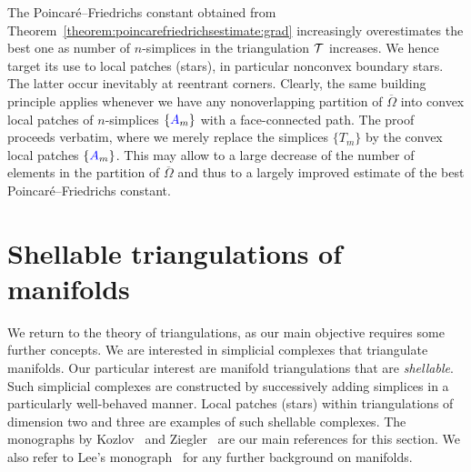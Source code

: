 \documentclass[10pt,letterpaper]{article}
\begin{document}
\begin{remark}
    The Poincar\'e--Friedrichs constant obtained from Theorem~\ref{theorem:poincarefriedrichsestimate:grad} increasingly overestimates the best one as number of $n$-simplices in the triangulation ${\mathcal T}$ increases. We hence target its use to local patches (stars), in particular nonconvex boundary stars. The latter occur inevitably at reentrant corners. Clearly, the same building principle applies whenever we have any nonoverlapping partition of $\overline \Omega$ into convex local patches of $n$-simplices $\{ {\color{blue}A}_m \}$ with a face-connected path. The proof proceeds verbatim, where we merely replace the simplices $\{ T_{m} \}$ by the convex local patches $\{ {\color{blue}A}_m \}$. This may allow to a large decrease of the number of elements in the partition of $\overline \Omega$ and thus to a largely improved estimate of the best Poincar\'e--Friedrichs constant. 
\end{remark}



    























\section{Shellable triangulations of manifolds}\label{section:advancedtriangulations}

We return to the theory of triangulations,
as our main objective requires some further concepts.
We are interested in simplicial complexes that triangulate manifolds. 
Our particular interest are manifold triangulations that are \emph{shellable}.
Such simplicial complexes are constructed by successively adding simplices in a particularly well-behaved manner. 
Local patches (stars) within triangulations of dimension two and three are examples of such shellable complexes. 
The monographs by Kozlov~\cite{kozlov2008combinatorial} and Ziegler~\cite{ziegler1995lectures} are our main references for this section. 
We also refer to Lee's monograph~\cite{lee2011topological} for any further background on manifolds. 
\end{document}
